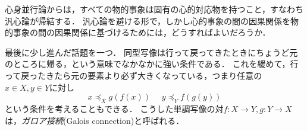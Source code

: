 \documentclass[dvipdfmx,11pt,a4paper]{jsarticle}
\begin{document}
\begin{develop}
心身並行論からは，すべての物的事象は固有の心的対応物を持つこと，すなわち汎心論が帰結する．
汎心論を避ける形で，しかし心的事象の間の因果関係を物的事象の間の因果関係に基づけるためには，どうすればよいだろうか．
\end{develop}

最後に少し進んだ話題を一つ．
同型写像は行って戻ってきたときにちょうど元のところに帰る，という意味でなかなかに強い条件である．
これを緩めて，行って戻ったきたら元の要素より必ず大きくなっている，つまり任意の$x \in X, y \in Y$に対し
\[
 x \preceq_X g(f(x)) \ \ \ \ \ \ y \preceq_Y f(g(y))
\]
という条件を考えることもできる．
こうした単調写像の対$f:X \to Y, g:Y \to X$は，\emph{ガロア接続}(Galois connection)と呼ばれる．
\end{document}
